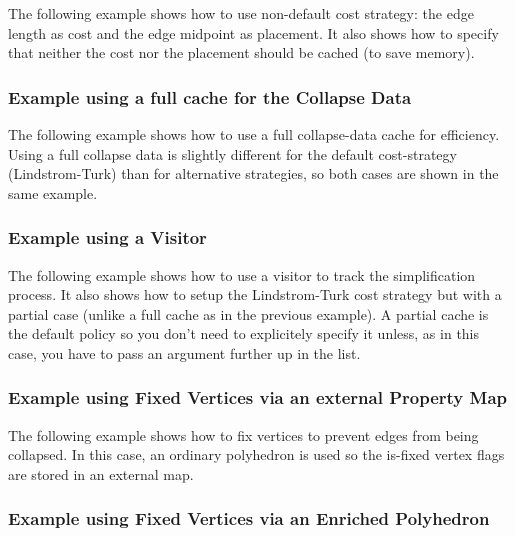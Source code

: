 The following example shows how to use non-default cost strategy: the edge length as cost and the edge
midpoint as placement. It also shows how to specify that neither the cost nor the placement should be cached (to save memory).


\subsubsection{Example using a full cache for the Collapse Data}

The following example shows how to use a full collapse-data cache for efficiency. Using a full collapse data is slightly different for the default cost-strategy (Lindstrom-Turk) than for alternative strategies, so both cases are shown in the same example.


\subsubsection{Example using a Visitor}

The following example shows how to use a visitor to track the simplification process. It also shows how to setup the Lindstrom-Turk cost strategy but with a partial case (unlike a full cache as in the previous example). A partial cache is the default policy so you don't need to explicitely specify it unless, as in this case, you have to pass an argument further up in the list.



\subsubsection{Example using Fixed Vertices via an external Property Map}

The following example shows how to fix vertices to prevent edges from being collapsed. In this case, an ordinary polyhedron is used so the is-fixed vertex flags are stored in an external map.


\subsubsection{Example using Fixed Vertices via an Enriched Polyhedron}


